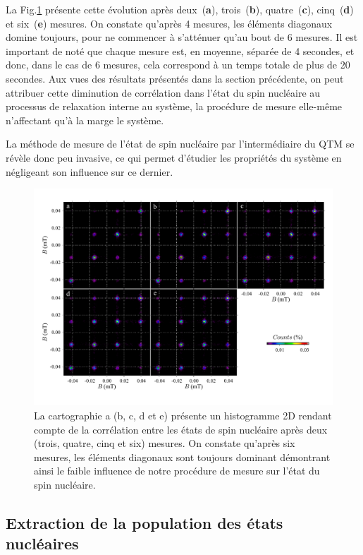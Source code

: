 La Fig.\ref{evolution_mesures} présente cette évolution après deux~(\textbf{a}), trois~(\textbf{b}), quatre~(\textbf{c}), cinq~(\textbf{d}) et six~(\textbf{e}) mesures. On constate qu'après 4 mesures, les éléments diagonaux domine toujours, pour ne commencer à s'atténuer qu'au bout de 6 mesures. Il est important de noté que chaque mesure est, en moyenne, séparée de 4 secondes, et donc, dans le cas de 6 mesures, cela correspond à un temps totale de plus de 20 secondes. Aux vues des résultats présentés dans la section précédente, on peut attribuer cette diminution de corrélation dans l'état du spin nucléaire au processus de relaxation interne au système, la procédure de mesure elle-même n'affectant qu'à la marge le système. 

La méthode de mesure de l'état de spin nucléaire par l'intermédiaire du QTM se révèle donc peu invasive, ce qui permet d'étudier les propriétés du système en négligeant son influence sur ce dernier.

\begin{figure}
\includegraphics[scale=0.45]{Resultats/Chap2/Figure3/figure3.pdf} 
\caption{La cartographie a (b, c, d et e) présente un histogramme 2D rendant compte de la corrélation entre les états de spin nucléaire après deux (trois, quatre, cinq et six) mesures. On constate qu'après six mesures, les éléments diagonaux sont toujours dominant démontrant ainsi le faible influence de notre procédure de mesure sur l'état du spin nucléaire.}
\label{evolution_mesures}
\end{figure}


\subsection{Extraction de la population des états nucléaires}

